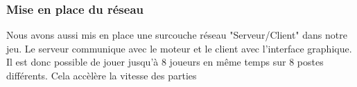     \subsubsection{Mise en place du réseau}
      Nous avons aussi mis en place une surcouche réseau "Serveur/Client" dans notre jeu. Le serveur communique avec le moteur et le client avec l'interface graphique.
      Il est donc possible de jouer jusqu'à 8 joueurs en même temps sur 8 postes différents. Cela accèlère la vitesse des parties